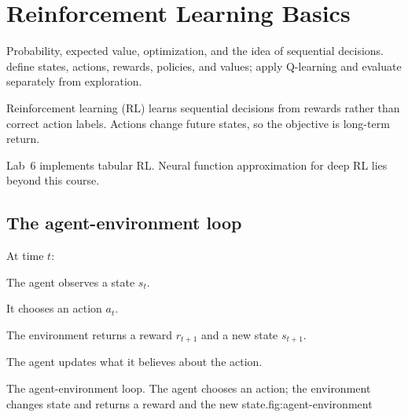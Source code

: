\chapter{Reinforcement Learning Basics}
\label{ch:rl}

\chapterguide%
  {Probability, expected value, optimization, and the idea of sequential decisions.}
  {define states, actions, rewards, policies, and values; apply Q-learning and evaluate separately from exploration.}

Reinforcement learning (RL) learns sequential decisions from rewards rather than correct action labels. Actions change future states, so the objective is long-term return.

\begin{coursechoice}
Lab~6 implements tabular RL. Neural function approximation for deep RL lies beyond this course.
\end{coursechoice}

\section{The agent-environment loop}

At time $t$:

\begin{utpsteps}
  \item The agent observes a state $s_t$.
  \item It chooses an action $a_t$.
  \item The environment returns a reward $r_{t+1}$ and a new state $s_{t+1}$.
  \item The agent updates what it believes about the action.
\end{utpsteps}

\begin{utpfig}{The agent-environment loop. The agent chooses an action; the environment changes state and returns a reward and the new state.}{fig:agent-environment}
\end{utpfig}

